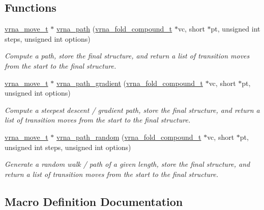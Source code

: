 \subsection*{Functions}
\begin{DoxyCompactItemize}
\item 
\hyperlink{group__neighbors_structvrna__move__s}{vrna\+\_\+move\+\_\+t} $\ast$ \hyperlink{group__paths_gab6aee4143f8b103518d5cbfe6bfe5eae}{vrna\+\_\+path} (\hyperlink{group__fold__compound_ga1b0cef17fd40466cef5968eaeeff6166}{vrna\+\_\+fold\+\_\+compound\+\_\+t} $\ast$vc, short $\ast$pt, unsigned int steps, unsigned int options)
\begin{DoxyCompactList}\small\item\em Compute a path, store the final structure, and return a list of transition moves from the start to the final structure. \end{DoxyCompactList}\item 
\hyperlink{group__neighbors_structvrna__move__s}{vrna\+\_\+move\+\_\+t} $\ast$ \hyperlink{group__paths_gae92cce443a8a64f7b7fb89867b7d6125}{vrna\+\_\+path\+\_\+gradient} (\hyperlink{group__fold__compound_ga1b0cef17fd40466cef5968eaeeff6166}{vrna\+\_\+fold\+\_\+compound\+\_\+t} $\ast$vc, short $\ast$pt, unsigned int options)
\begin{DoxyCompactList}\small\item\em Compute a steepest descent / gradient path, store the final structure, and return a list of transition moves from the start to the final structure. \end{DoxyCompactList}\item 
\hyperlink{group__neighbors_structvrna__move__s}{vrna\+\_\+move\+\_\+t} $\ast$ \hyperlink{group__paths_ga9234756c337078fa599529d3db70d913}{vrna\+\_\+path\+\_\+random} (\hyperlink{group__fold__compound_ga1b0cef17fd40466cef5968eaeeff6166}{vrna\+\_\+fold\+\_\+compound\+\_\+t} $\ast$vc, short $\ast$pt, unsigned int steps, unsigned int options)
\begin{DoxyCompactList}\small\item\em Generate a random walk / path of a given length, store the final structure, and return a list of transition moves from the start to the final structure. \end{DoxyCompactList}\end{DoxyCompactItemize}


\subsection{Macro Definition Documentation}
\mbox{\label{group__paths_ga705cea2b3243a38a2d6e3b1e141ed061}} 
